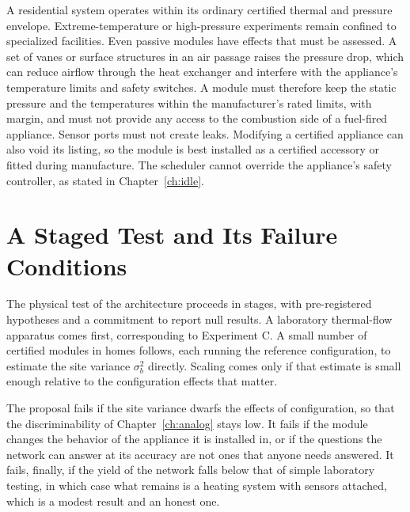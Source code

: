 A residential system operates within its ordinary certified thermal and pressure envelope. Extreme-temperature or high-pressure experiments remain confined to specialized facilities. Even passive modules have effects that must be assessed. A set of vanes or surface structures in an air passage raises the pressure drop, which can reduce airflow through the heat exchanger and interfere with the appliance's temperature limits and safety switches. A module must therefore keep the static pressure and the temperatures within the manufacturer's rated limits, with margin, and must not provide any access to the combustion side of a fuel-fired appliance. Sensor ports must not create leaks. Modifying a certified appliance can also void its listing, so the module is best installed as a certified accessory or fitted during manufacture. The scheduler cannot override the appliance's safety controller, as stated in Chapter~\ref{ch:idle}.

\section{A Staged Test and Its Failure Conditions}

The physical test of the architecture proceeds in stages, with pre-registered hypotheses and a commitment to report null results. A laboratory thermal-flow apparatus comes first, corresponding to Experiment C. A small number of certified modules in homes follows, each running the reference configuration, to estimate the site variance $\sigma_b^{2}$ directly. Scaling comes only if that estimate is small enough relative to the configuration effects that matter.

The proposal fails if the site variance dwarfs the effects of configuration, so that the discriminability of Chapter~\ref{ch:analog} stays low. It fails if the module changes the behavior of the appliance it is installed in, or if the questions the network can answer at its accuracy are not ones that anyone needs answered. It fails, finally, if the yield of the network falls below that of simple laboratory testing, in which case what remains is a heating system with sensors attached, which is a modest result and an honest one.
